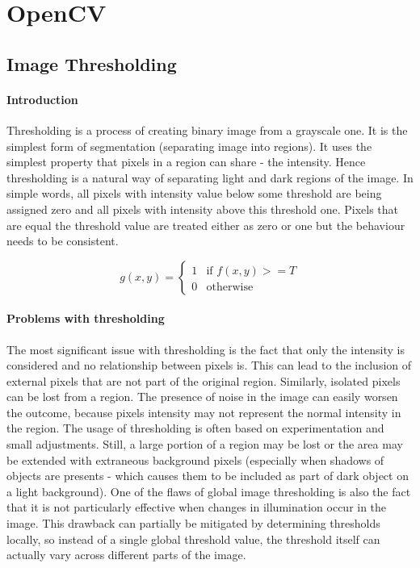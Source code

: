 \paragraph{}

\section{OpenCV}
\subsection{Image Thresholding}
\paragraph{Introduction}
Thresholding is a process of creating binary image from a grayscale one.\cite{digital-image-processing} It is the simplest form of segmentation (separating image into regions). It uses the simplest property that pixels in a region can share - the intensity. Hence thresholding is a natural way of separating light and dark regions of the image. In simple words, all pixels with intensity value below some threshold are being assigned zero and all pixels with intensity above this threshold one. Pixels that are equal the threshold value are treated either as zero or one but the behaviour needs to be consistent. 

\begin{equation}
	g(x, y) = \begin{cases}
		1 & \text{if $f(x, y) >= T$}\\
		0 & \text{otherwise}
	\end{cases}
\end{equation}

\paragraph{Problems with thresholding}
The most significant issue with thresholding is the fact that only the intensity is considered and no relationship between pixels is. This can lead to the inclusion of external pixels that are not part of the original region. Similarly, isolated pixels can be lost from a region. The presence of noise in the image can easily worsen the outcome, because pixels intensity may not represent the normal intensity in the region. The usage of thresholding is often based on experimentation and small adjustments. Still, a large portion of a region may be lost or the area may be extended with extraneous background pixels (especially when shadows of objects are presents - which causes them to be included as part of dark object on a light background). One of the flaws of global image thresholding is also the fact that it is not particularly effective when changes in illumination occur in the image. This drawback can partially be mitigated by determining thresholds locally, so instead of a single global threshold value, the threshold itself can actually vary across different parts of the image.

